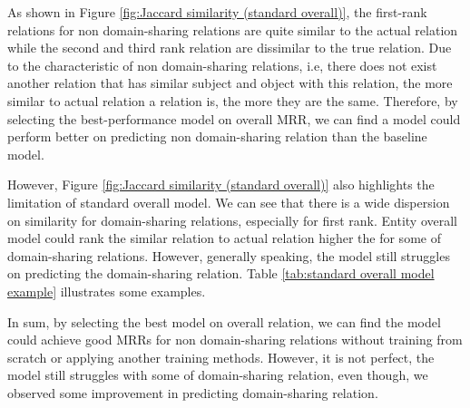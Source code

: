 As shown in Figure \ref{fig:Jaccard similarity (standard overall)}, the first-rank relations for non domain-sharing relations are quite similar to the actual relation while the second and third rank relation are dissimilar to the true relation. Due to the characteristic of non domain-sharing relations, i.e, there does not exist another relation that has similar subject and object with this relation, the more similar to actual relation a relation is, the more they are the same. Therefore, by selecting the best-performance model on overall MRR, we can find a model could perform better on predicting non domain-sharing relation than the baseline model. 

However, Figure \ref{fig:Jaccard similarity (standard overall)} also highlights the limitation of standard overall model. We can see that there is a wide dispersion on similarity for domain-sharing relations, especially for first rank. Entity overall model could rank the similar relation to actual relation higher the for some of domain-sharing relations. However, generally speaking, the model still struggles on predicting the domain-sharing relation. Table \ref{tab:standard overall model example} illustrates some examples.

In sum, by selecting the best model on overall relation, we can find the model could achieve good MRRs for non domain-sharing relations without training from scratch or applying another training methods. However, it is not perfect, the model still struggles with some of domain-sharing relation, even though, we observed some improvement in predicting domain-sharing relation. 

